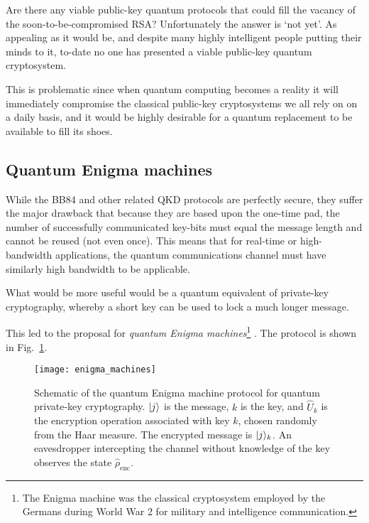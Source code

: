 Are there any viable public-key quantum protocols that could fill the vacancy of the soon-to-be-compromised RSA? Unfortunately the answer is `not yet'. As appealing as it would be, and despite many highly intelligent people putting their minds to it, to-date no one has presented a viable public-key quantum cryptosystem.

This is problematic since when quantum computing becomes a reality it will immediately compromise the classical public-key cryptosystems we all rely on on a daily basis, and it would be highly desirable for a quantum replacement to be available to fill its shoes.

%
%

\subsection{Quantum Enigma machines}

While the BB84 and other related QKD protocols are perfectly secure, they suffer the major drawback that because they are based upon the one-time pad, the number of successfully communicated key-bits must equal the message length and cannot be reused (not even once). This means that for real-time or high-bandwidth applications, the quantum communications channel must have similarly high bandwidth to be applicable.

What would be more useful would be a quantum equivalent of private-key cryptography, whereby a short key can be
used to lock a much longer message.

This led to the proposal for \textit{quantum Enigma machines}\footnote{The Enigma machine was the classical cryptosystem employed by the Germans during World War 2 for military and intelligence communication.} \cite{bib:LloydEnigma}. The protocol is shown in Fig.~\ref{fig:enigma}.

\begin{figure}[!htbp]
\texttt{[image: enigma\_machines]}
\captionspacefig \caption{Schematic of the quantum Enigma machine protocol for quantum private-key cryptography. $|j\rangle$ is the message, $k$ is the key, and $\hat{U}_k$ is the encryption operation associated with key $k$, chosen randomly from the Haar measure. The encrypted message is $|j\rangle_k$. An eavesdropper intercepting the channel without knowledge of the key observes the state $\hat\rho_\mathrm{enc}$.}\label{fig:enigma}	
\end{figure}

